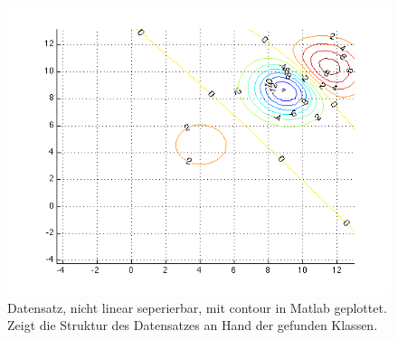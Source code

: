 \documentclass[12pt]{article}
\begin{document}
\begin{figure}[htp]
	\centering
	\includegraphics[width=1\textwidth]{contour}
	\caption{Datensatz, nicht linear seperierbar, mit contour in Matlab geplottet. Zeigt die Struktur des Datensatzes an Hand der gefunden Klassen.}
	\label{fig:contour}
\end{figure}



\end{document}
